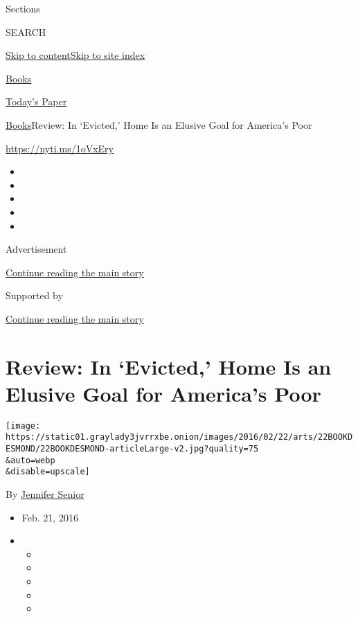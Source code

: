 Sections

SEARCH

\protect\hyperlink{site-content}{Skip to
content}\protect\hyperlink{site-index}{Skip to site index}

\href{https://www.nytimes3xbfgragh.onion/section/books}{Books}

\href{https://myaccount.nytimes3xbfgragh.onion/auth/login?response_type=cookie\&client_id=vi}{}

\href{https://www.nytimes3xbfgragh.onion/section/todayspaper}{Today's
Paper}

\href{/section/books}{Books}\textbar{}Review: In `Evicted,' Home Is an
Elusive Goal for America's Poor

\url{https://nyti.ms/1oVxEry}

\begin{itemize}
\item
\item
\item
\item
\item
\end{itemize}

Advertisement

\protect\hyperlink{after-top}{Continue reading the main story}

Supported by

\protect\hyperlink{after-sponsor}{Continue reading the main story}

\hypertarget{review-in-evicted-home-is-an-elusive-goal-for-americas-poor}{%
\section{Review: In `Evicted,' Home Is an Elusive Goal for America's
Poor}\label{review-in-evicted-home-is-an-elusive-goal-for-americas-poor}}

\texttt{[image: https://static01.graylady3jvrrxbe.onion/images/2016/02/22/arts/22BOOKDESMOND/22BOOKDESMOND-articleLarge-v2.jpg?quality=75\\\&auto=webp\\\&disable=upscale]}

By \href{http://www.nytimes3xbfgragh.onion/by/jennifer-senior}{Jennifer
Senior}

\begin{itemize}
\item
  Feb. 21, 2016
\item
  \begin{itemize}
  \item
  \item
  \item
  \item
  \item
  \end{itemize}
\end{itemize}

